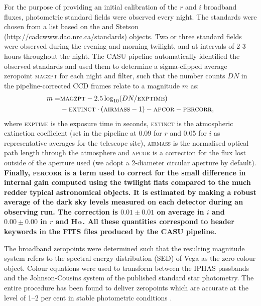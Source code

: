 \documentclass[a4paper,useAMS,usenatbib]{mn2e}
\def\ha{\mbox{H$\rm \alpha$}}
\begin{document}
For the purpose of providing an initial calibration 
of the $r$ and $i$ broadband fluxes,
photometric standard fields were observed every night.
The standards were chosen from a list based on 
the \cite{Landolt1992} and Stetson (http://cadcwww.dao.nrc.ca/standards) 
objects.
Two or three standard fields were observed 
during the evening and morning twilight,
and at intervals of 2-3 hours throughout the night.
The CASU pipeline automatically identified the observed standards 
and used them to determine a sigma-clipped average zeropoint \textsc{magzpt}
for each night and filter,
such that the number counts $DN$ 
in the pipeline-corrected CCD frames
relate to a magnitude $m$ as:
\begin{equation}
\begin{split}
   m  = & \textsc{magzpt} - 2.5 \log_{10}( DN / \textsc{exptime} ) \\
 &  - \textsc{extinct}\cdot(\textsc{airmass}-1) - \textsc{apcor} - \textsc{percorr},
\label{eqn:mag}
\end{split}
\end{equation}
where \textsc{exptime} is the exposure time in seconds,
\textsc{extinct} is the atmospheric extinction coefficient 
(set in the pipeline at 0.09 for $r$ and 0.05 for $i$ as representative
averages for the telescope site),
\textsc{airmass} is the normalised optical path length 
through the atmosphere and
\textsc{apcor} is a correction for the flux
lost outside of the aperture used
(we adopt a 2-diameter circular aperture by default).
{\bf
Finally, \textsc{percorr} is a term used to correct 
for the small difference in internal gain
computed using the twilight flats
compared to the much redder typical astronomical objects. 
It is estimated by making a robust average of the dark sky levels 
measured on each detector during an observing run.
The correction is $0.01\pm0.01$ on average in $i$ and
$0.00\pm0.00$ in $r$ and \ha.
All these quantities correspond to header keywords
in the FITS files produced by the CASU pipeline. }

The broadband zeropoints were determined such that the resulting magnitude system
refers to the spectral energy distribution (SED) of Vega 
as the zero colour object. 
Colour equations were used to transform between the IPHAS passbands 
and the Johnson-Cousins system 
of the published standard star photometry.
The entire procedure has been found to deliver zeropoints which 
are accurate at the level of 1--2 per cent 
in stable photometric conditions \citep{Gonzalez-Solares2011}.
\end{document}
